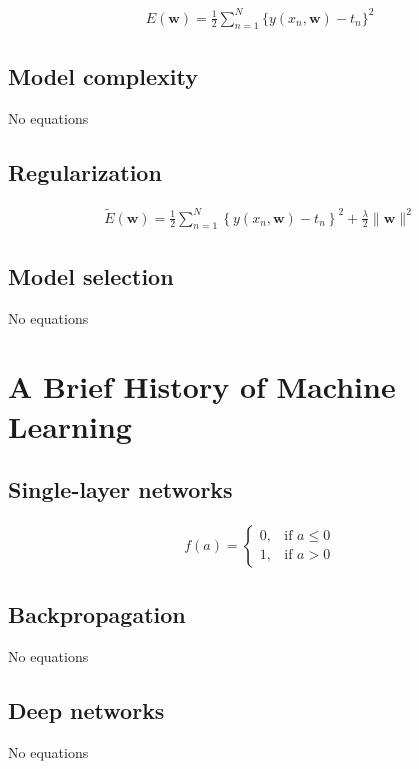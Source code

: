 \documentclass{article}
\begin{document}
\begin{align*}
E(\mathbf{w})=\frac{1}{2} \sum_{n=1}^{N} \big\{ y (x_{n}, \mathbf{w}) - t_{n}\big\}^{2}
\tag{1.2}
\end{align*}

\subsection{Model complexity}

No equations

\subsection{Regularization}

\begin{align*}
\widetilde{E}(\mathbf{w})=\frac{1}{2} \sum_{n=1}^{N} \left\{ y\left( x_{n}, \mathbf{w} \right) - t_{n} \right\}^{2} + \frac{\lambda}{2} \|\mathbf{w}\|^{2}
\tag{1.4}
\end{align*}

\subsection{Model selection}
No equations

\section{A Brief History of Machine Learning}

\subsection{Single-layer networks}

\begin{align*}
f(a) =
\begin{cases} 
0, & \text{if } a \leqslant 0 \\
1, & \text{if } a > 0 
\end{cases}
\tag{1.7}
\end{align*}

\subsection{Backpropagation}
No equations

\subsection{Deep networks}
No equations
\end{document}
